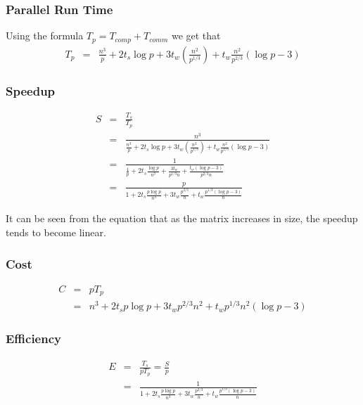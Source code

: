 \documentclass{article}
\begin{document}
\subsubsection{Parallel Run Time}

Using the formula $T_p = T_{{comp}} + T_{{comm}}$ we get that 
\begin{eqnarray*}
T_p &=& \frac{n^3}{p} + 2 t_s \log{p} + 3 t_w \left( \frac{n^2}{{p}^{1/3}} \right) + t_w \frac{n^2}{p^{2/3}} (\log{p} - 3)
\end{eqnarray*}

\subsubsection{Speedup}

\begin{eqnarray*}
S &=& \frac{T_s}{T_p} \\
  &=& \frac{n^3}{\frac{n^3}{p} + 2 t_s \log{p} + 3 t_w \left( \frac{n^2}{{p}^{1/3}} \right) + t_w \frac{n^2}{p^{2/3}} (\log{p} - 3)} \\
  &=& \frac{1}{ \frac{1}{p} + 2 t_s \frac{\log{p}}{n^3} + \frac{3 t_w}{p^{1/3} n} + \frac{t_w (\log{p} - 3)}{p^{2/3} n} } \\
  &=& \frac{p}{   1 + 2 t_s \frac{ p \log{p} }{ n^3 } + 3 t_w \frac{p^{2/3}}{n} + t_w \frac{p^{1/3} (\log{p} - 3)}{n}      }
\end{eqnarray*}

It can be seen from the equation that as the matrix increases in size, the speedup tends to become linear.

\subsubsection{Cost}

\begin{eqnarray*}
C &=& p T_p \\
  &=& n^3 + 2 t_s p \log{p} + 3 t_w p^{2/3} n^2 + t_w p^{1/3} n^2 (\log{p} - 3)
\end{eqnarray*}

\subsubsection{Efficiency}

\begin{eqnarray*}
E &=& \frac{T_s}{p T_p} = \frac{S}{p} \\
  &=& \frac{1}{   1 + 2 t_s \frac{ p \log{p} }{ n^3 } + 3 t_w \frac{p^{2/3}}{n} + t_w \frac{p^{1/3} (\log{p} - 3)}{n} } \\
\end{eqnarray*}
\end{document}
